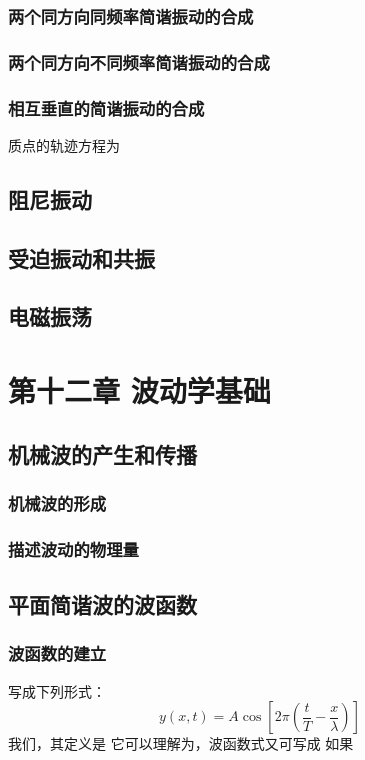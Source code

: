     \subsection{两个同方向同频率简谐振动的合成}
    \subsection{两个同方向不同频率简谐振动的合成}
    \subsection{相互垂直的简谐振动的合成}
    质点的轨迹方程为

\section{阻尼振动}

\section{受迫振动和共振}

\section{电磁振荡}

\chapter{第十二章 波动学基础}

\section{机械波的产生和传播}
    \subsection{机械波的形成}
    \subsection{描述波动的物理量}

\section{平面简谐波的波函数}
    \subsection{波函数的建立}
    写成下列形式：
    \[
    y(x,t)=A\cos\left[2\pi\left(\frac{t}{T}-\frac{x}{\lambda}\right)\right]
    \]
    我们，其定义是
    它可以理解为，波函数式又可写成
    如果

